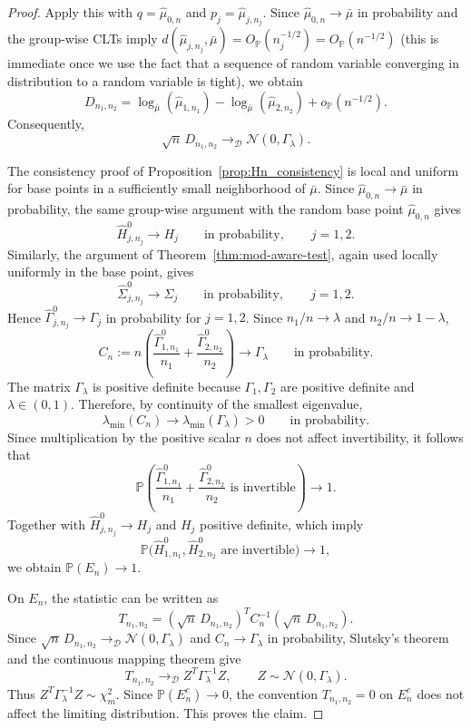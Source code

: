 \documentclass{amsart}
\theoremstyle{definition}
\theoremstyle{remark}
\newcommand\0{\boldsymbol{0}}
\begin{document}
\begin{proof}
Apply this with \(q=\hat\mu_{0,n}\) and \(p_j=\hat\mu_{j,n_j}\).  Since \(\hat\mu_{0,n}\to\bar\mu\) in probability and the group-wise CLTs imply \(d(\hat\mu_{j,n_j},\bar\mu)=O_{\mathbb P}(n_j^{-1/2})=O_{\mathbb P}(n^{-1/2})\) (this is immediate once we use the fact that a sequence of random variable converging in distribution to a random variable is tight), we obtain
\[
D_{n_1,n_2}
=
\log_{\bar\mu}(\hat\mu_{1,n_1})
-
\log_{\bar\mu}(\hat\mu_{2,n_2})
+
o_{\mathbb P}(n^{-1/2}).
\]
Consequently,
\[
\sqrt n\,D_{n_1,n_2}
\rightarrow_{\mathcal D}
\mathcal N(0,\Gamma_\lambda).
\]

The consistency proof of Proposition~\ref{prop:Hn_consistency} is local and uniform for base points in a sufficiently small neighborhood of \(\bar\mu\).  Since \(\hat\mu_{0,n}\to\bar\mu\) in probability, the same group-wise argument with the random base point \(\hat\mu_{0,n}\) gives
\[
\widehat H^0_{j,n_j}\to H_j
\qquad\text{in probability},\qquad j=1,2.
\]
Similarly, the argument of Theorem~\ref{thm:mod-aware-test}, again used locally uniformly in the base point, gives
\[
\widehat\Sigma^0_{j,n_j}\to\Sigma_j
\qquad\text{in probability},\qquad j=1,2.
\]
Hence \(\widehat\Gamma^0_{j,n_j}\to\Gamma_j\) in probability for \(j=1,2\).  Since \(n_1/n\to\lambda\) and \(n_2/n\to1-\lambda\),
\[
C_n:=
n\left(
\frac{\widehat\Gamma^0_{1,n_1}}{n_1}
+
\frac{\widehat\Gamma^0_{2,n_2}}{n_2}
\right)
\to
\Gamma_\lambda
\qquad\text{in probability}.
\]
The matrix \(\Gamma_\lambda\) is positive definite because \(\Gamma_1,\Gamma_2\) are positive definite and \(\lambda\in(0,1)\).  Therefore, by continuity of the smallest eigenvalue,
\[
\lambda_{\min}(C_n)\to \lambda_{\min}(\Gamma_\lambda)>0
\qquad\text{in probability}.
\]
Since multiplication by the positive scalar \(n\) does not affect invertibility, it follows that
\[
\mathbb P\!\left(
\frac{\widehat\Gamma^0_{1,n_1}}{n_1}
+
\frac{\widehat\Gamma^0_{2,n_2}}{n_2}
\text{ is invertible}
\right)\to1.
\]
Together with \(\widehat H^0_{j,n_j}\to H_j\) and \(H_j\) positive definite, which imply
\[
\mathbb P\bigl(\widehat H^0_{1,n_1},\widehat H^0_{2,n_2}
\text{ are invertible}\bigr)\to1,
\]
we obtain \(\mathbb P(E_n)\to1\).

On \(E_n\), the statistic can be written as
\[
T_{n_1,n_2}
=
(\sqrt n\,D_{n_1,n_2})^T
C_n^{-1}
(\sqrt n\,D_{n_1,n_2}).
\]
Since \(\sqrt n\,D_{n_1,n_2}\rightarrow_{\mathcal D}\mathcal N(0,\Gamma_\lambda)\) and \(C_n\to\Gamma_\lambda\) in probability, Slutsky's theorem and the continuous mapping theorem give
\[
T_{n_1,n_2}
\rightarrow_{\mathcal D}
Z^T\Gamma_\lambda^{-1}Z,
\qquad
Z\sim\mathcal N(0,\Gamma_\lambda).
\]
Thus \(Z^T\Gamma_\lambda^{-1}Z\sim\chi^2_m\).  Since \(\mathbb P(E_n^c)\to0\), the convention \(T_{n_1,n_2}=0\) on \(E_n^c\) does not affect the limiting distribution.  This proves the claim.
\end{proof}
\end{document}

